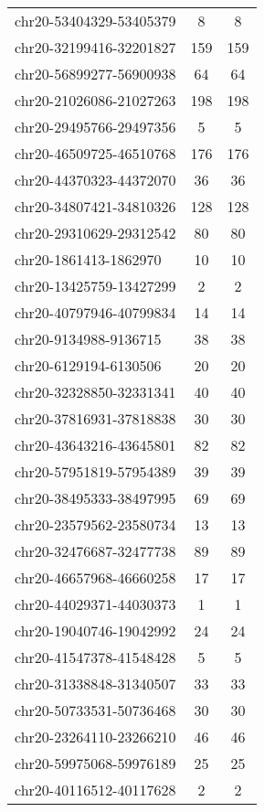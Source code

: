 \documentclass[10pt,letterpaper]{article}
\begin{document}
{\begin{longtable}{lSS}
	chr20-53404329-53405379 & 8      & 8        \\
	chr20-32199416-32201827 & 159    & 159      \\
	chr20-56899277-56900938 & 64     & 64       \\
	chr20-21026086-21027263 & 198    & 198      \\
	chr20-29495766-29497356 & 5      & 5        \\
	chr20-46509725-46510768 & 176    & 176      \\
	chr20-44370323-44372070 & 36     & 36       \\
	chr20-34807421-34810326 & 128    & 128      \\
	chr20-29310629-29312542 & 80     & 80       \\
	chr20-1861413-1862970   & 10     & 10       \\
	chr20-13425759-13427299 & 2      & 2        \\
	chr20-40797946-40799834 & 14     & 14       \\
	chr20-9134988-9136715   & 38     & 38       \\
	chr20-6129194-6130506   & 20     & 20       \\
	chr20-32328850-32331341 & 40     & 40       \\
	chr20-37816931-37818838 & 30     & 30       \\
	chr20-43643216-43645801 & 82     & 82       \\
	chr20-57951819-57954389 & 39     & 39       \\
	chr20-38495333-38497995 & 69     & 69       \\
	chr20-23579562-23580734 & 13     & 13       \\
	chr20-32476687-32477738 & 89     & 89       \\
	chr20-46657968-46660258 & 17     & 17       \\
	chr20-44029371-44030373 & 1      & 1        \\
	chr20-19040746-19042992 & 24     & 24       \\
	chr20-41547378-41548428 & 5      & 5        \\
	chr20-31338848-31340507 & 33     & 33       \\
	chr20-50733531-50736468 & 30     & 30       \\
	chr20-23264110-23266210 & 46     & 46       \\
	chr20-59975068-59976189 & 25     & 25       \\
	chr20-40116512-40117628 & 2      & 2        \\

\end{longtable}}
\end{document}
